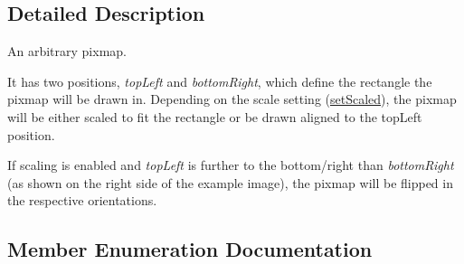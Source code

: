 \subsection{Detailed Description}
An arbitrary pixmap. 

 It has two positions, {\itshape top\+Left} and {\itshape bottom\+Right}, which define the rectangle the pixmap will be drawn in. Depending on the scale setting (\hyperlink{classQCPItemPixmap_ab4d44529a1c6c8d37d0ea7560e042777}{set\+Scaled}), the pixmap will be either scaled to fit the rectangle or be drawn aligned to the top\+Left position.

If scaling is enabled and {\itshape top\+Left} is further to the bottom/right than {\itshape bottom\+Right} (as shown on the right side of the example image), the pixmap will be flipped in the respective orientations. 

\subsection{Member Enumeration Documentation}
